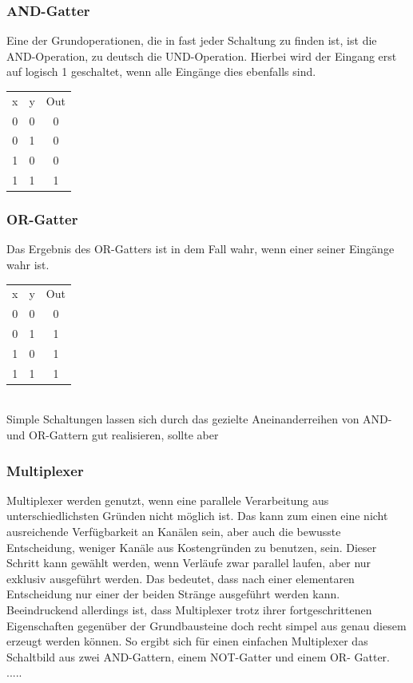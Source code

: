\documentclass[conference]{IEEEtran}
\begin{document}
\subsubsection{AND-Gatter}
Eine der Grundoperationen, die in fast jeder Schaltung zu finden ist, ist die AND-Operation, zu deutsch die UND-Operation. Hierbei wird der Eingang erst auf logisch 1 geschaltet, wenn alle Eingänge dies ebenfalls sind.\\
\begin{tabular}[h]{ccc}
x&y&Out\\
0&0&0\\
0&1&0\\
1&0&0\\
1&1&1\\
\end{tabular}
\subsubsection{OR-Gatter}
Das Ergebnis des OR-Gatters ist in dem Fall wahr, wenn einer seiner Eingänge wahr ist.\\
\begin{tabular}[h]{ccc}
x&y&Out\\
0&0&0\\
0&1&1\\
1&0&1\\
1&1&1\\
\end{tabular}
\\Simple Schaltungen lassen sich durch das gezielte Aneinanderreihen von AND- und OR-Gattern gut realisieren, sollte aber 
\subsubsection{Multiplexer}
Multiplexer werden genutzt, wenn eine parallele Verarbeitung aus unterschiedlichsten Gründen nicht möglich ist. Das kann zum einen eine nicht ausreichende Verfügbarkeit an Kanälen sein, aber auch die bewusste Entscheidung, weniger Kanäle aus Kostengründen zu benutzen, sein. Dieser Schritt kann gewählt werden, wenn Verläufe zwar parallel laufen, aber nur exklusiv ausgeführt werden. Das bedeutet, dass nach einer elementaren Entscheidung nur einer der beiden Stränge ausgeführt werden kann. Beeindruckend allerdings ist, dass Multiplexer trotz ihrer fortgeschrittenen Eigenschaften gegenüber der Grundbausteine doch recht simpel aus genau diesem erzeugt werden können. So ergibt sich für einen einfachen Multiplexer das Schaltbild aus zwei AND-Gattern, einem NOT-Gatter und einem OR- Gatter. .....
\end{document}
